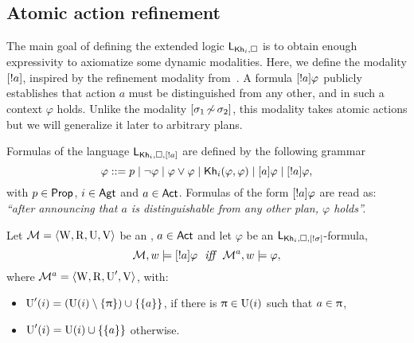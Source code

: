 \subsection{Atomic action refinement}
\label{subsec:atom-ref}

The main goal of defining the extended logic $\mathsf{L}_{{\sf Kh}_i,\square}$ is to obtain enough expressivity to axiomatize some dynamic modalities. Here, we define the modality $[!a]$, inspired by the refinement modality from~. A formula $[!a]\varphi$ publicly establishes that action $a$ must be distinguished from any other, and in such a context $\varphi$ holds. Unlike the modality $[{\sigma_1{\,\not\sim\,}\sigma_2}]$, this modality takes atomic actions but we will generalize it later to arbitrary plans. 

\medskip

\begin{definition}\label{def:ssrefsyntax}
Formulas of the language $\mathsf{L}_{{\sf Kh}_i,\square,[!a]}$ are defined by the following grammar
\[
\varphi ::= p \mid \neg\varphi \mid \varphi\vee\varphi \mid {\sf Kh}_i(\varphi,\varphi) \mid [a]\varphi \mid [!a]\varphi,
\]
with $p \in {\rm \sf Prop}$, $i\in{\rm \sf Agt}$ and $a \in {\rm \sf Act}$. Formulas of the form $[!a]\varphi$ are read as: \emph{``after announcing that $a$ is distinguishable from any other plan, $\varphi$ holds''.} 
\end{definition}

\medskip

\begin{definition}\label{def:ssrefsemantics}
Let $\mathcal{M} = \langle \operatorname{W}, \operatorname{R}, \operatorname{U}, \operatorname{V} \rangle$ be an \ults, $a \in {\rm \sf Act}$ and let $\varphi$ be an  $\mathsf{L}_{{\sf Kh}_i,\square,[!\sigma]}$-formula,
\[
\modults,w \models \srefbox{a}\varphi \ \ \iff \ \ \modults^a,w \models \varphi,
\] 
where $\mathcal{M}^a = \langle \operatorname{W},\operatorname{R},\operatorname{U}',\operatorname{V} \rangle$, with:
\begin{itemize}
\item $\operatorname{U}'(i) = (\operatorname{U}(i) \setminus \{ \uppi \}) \cup \{ \{ a \} \}$, if there is $\uppi \in \operatorname{U}(i)$ such that $a \in \uppi$,
\item $\operatorname{U}'(i) = \operatorname{U}(i) \cup \{ \{ a \} \}$ otherwise.
\end{itemize}
\end{definition}

